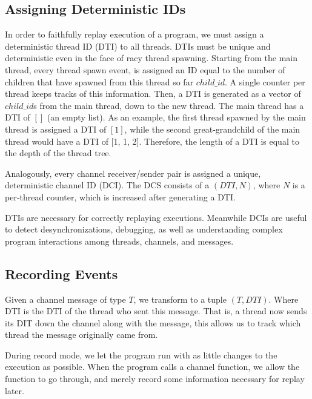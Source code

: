 \documentclass{article}
\begin{document}
\subsection{Assigning Deterministic IDs}
In order to faithfully replay execution of a program, we must assign a deterministic
thread ID (DTI) to all threads. DTIs must be unique and deterministic
even in the face of racy thread spawning. Starting from the main thread,
every thread spawn event, is assigned an ID equal to the number of children that
have spawned from this thread so far $child\_id$. A single counter per thread keeps tracks of this information. Then, a DTI is generated as a vector of $child\_id$s from the main thread, down to the new thread. The main thread has a DTI of $[]$ (an empty list). As an example, the first thread spawned by the main thread is assigned a DTI of $[1]$, while the second great-grandchild of the main thread would have a DTI of [1, 1, 2]. Therefore, the length of a DTI is equal to the depth of the thread tree.

Analogously, every channel receiver/sender pair is assigned a unique, deterministic channel ID (DCI).
The DCS consists of a $(DTI, N)$, where $N$ is a per-thread
counter, which is increased after generating a DTI.

DTIs are necessary for correctly replaying executions. Meanwhile DCIs are useful to detect
desynchronizations, debugging, as well as understanding complex program interactions among
threads, channels, and messages.

\subsection{Recording Events}
Given a channel message of type $T$, we transform to a tuple $(T, DTI)$. Where DTI is
the DTI of the thread who sent this message. That is, a thread now sends its DIT down
the channel along with the message, this allows us to track which thread the message
originally came from.

During record mode, we let the program run with as little changes to the execution as
possible. When the program calls a channel function, we allow the function to go through, and merely record some information necessary for replay later.
\end{document}

